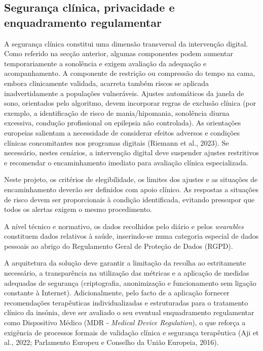 \subsection{Segurança clínica, privacidade e enquadramento regulamentar}
\label{sec:chap2_segurancaClinica}

A segurança clínica constitui uma dimensão transversal da intervenção digital. Como referido na secção anterior, algumas componentes podem aumentar temporariamente a sonolência e exigem avaliação da adequação e acompanhamento. A componente de restrição ou compressão do tempo na cama, embora clinicamente validada, acarreta também riscos se aplicada inadvertidamente a populações vulneráveis. Ajustes automáticos da janela de sono, orientados pelo algoritmo, devem incorporar regras de exclusão clínica (por exemplo, a identificação de risco de mania/hipomania, sonolência diurna excessiva, condução profissional ou epilepsia não controlada). As orientações europeias salientam a necessidade de considerar efeitos adversos e condições clínicas concomitantes nos programas digitais (Riemann et al., 2023). Se necessário, nestes cenários, a intervenção digital deve suspender ajustes restritivos e recomendar o encaminhamento imediato para avaliação clínica especializada. 

Neste projeto, os critérios de elegibilidade, os limites dos ajustes e as situações de encaminhamento deverão ser definidos com apoio clínico. As respostas a situações de risco devem ser proporcionais à condição identificada, evitando pressupor que todos os alertas exigem o mesmo procedimento.  

A nível técnico e normativo, os dados recolhidos pelo diário e pelos \textit{wearables} constituem dados relativos à saúde, inserindo-se numa categoria especial de dados pessoais ao abrigo do Regulamento Geral de Proteção de Dados (RGPD).   

A arquitetura da solução deve garantir a limitação da recolha ao estritamente necessário, a transparência na utilização das métricas e a aplicação de medidas adequadas de segurança (criptografia, anonimização e funcionamento sem ligação constante à Internet). Adicionalmente, pelo facto de a aplicação fornecer recomendações terapêuticas individualizadas e estruturadas para o tratamento clínico da insónia, deve ser avaliado o seu eventual enquadramento regulamentar como Dispositivo Médico (MDR - \textit{Medical Device Regulation}), o que reforça a exigência de processos formais de validação clínica e segurança terapêutica (Aji et al., 2022; Parlamento Europeu e Conselho da União Europeia, 2016).

